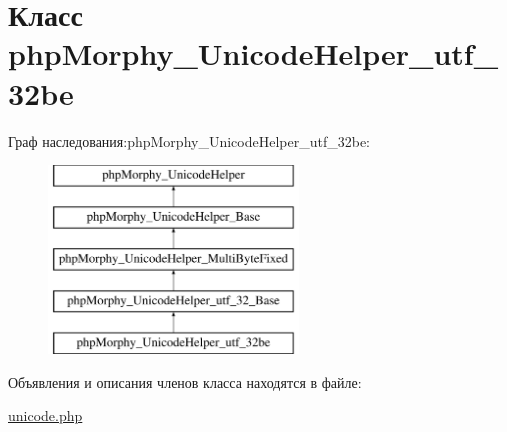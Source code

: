 \hypertarget{classphpMorphy__UnicodeHelper__utf__32be}{
\section{Класс phpMorphy\_\-UnicodeHelper\_\-utf\_\-32be}
\label{classphpMorphy__UnicodeHelper__utf__32be}
}
Граф наследования:phpMorphy\_\-UnicodeHelper\_\-utf\_\-32be:\begin{figure}[H]
\begin{center}
\leavevmode
\includegraphics[height=5.000000cm]{classphpMorphy__UnicodeHelper__utf__32be}
\end{center}
\end{figure}


Объявления и описания членов класса находятся в файле:\begin{DoxyCompactItemize}
\item 
\hyperlink{unicode_8php}{unicode.php}\end{DoxyCompactItemize}
